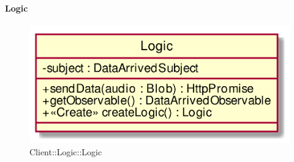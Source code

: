 \hypertarget{Logic_label}{\paragraph{Logic}}
\begin{figure}[h]
	\centering
	\includegraphics[width=\textwidth,height=\textheight,keepaspectratio]{images/ClassLogic.png}
	\caption{Client::Logic::Logic}
\end{figure}
